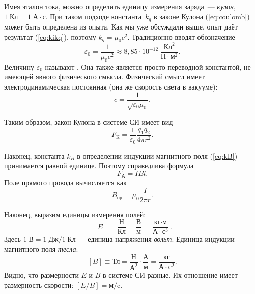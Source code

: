 Имея эталон тока, можно определить единицу измерения заряда~--- \emph{кулон},
$1\;\text{Кл}=1\;\text{А}\cdot\text{с}$. При таком подходе константа~$k_{q}$ в законе Кулона (\ref{eq:coulomb}) может быть определена
из опыта. Как мы уже обсуждали выше, опыт даёт результат (\ref{eq:kikq}),
поэтому $k_{q}=\mu_{0}c^{2}$. Традиционно вводят обозначение
\begin{equation}
\varepsilon_{0}=\frac{1}{\mu_{0}c^{2}}\approx8{,}85\cdot10^{-12}\;\frac{\text{Кл}^{2}}{\text{Н}\cdot\text{м}^{2}}.
\end{equation}
Величину $\varepsilon_{0}$ называют .
Она также является просто переводной константой, не имеющей
явного физического смысла. Физический смысл имеет электродинамическая
постоянная (она же скорость
света в вакууме):
\[
c = \frac{1}{\sqrt{\varepsilon_{0}\mu_{0}}}.
\]


Таким образом, закон Кулона в системе СИ имеет вид
\begin{equation}
F_{\text{К}}=\frac{1}{\varepsilon_{0}}\frac{q_{1}q_{2}}{4\pi r^{2}}.
\end{equation}

Наконец, константа $k_{B}$ в определении индукции магнитного поля
(\ref{eq:kB}) принимается равной единице. Поэтому справедлива формула
\begin{equation}
F_{\text{А}}=IBl.
\end{equation}
Поле прямого провода вычисляется как
\[
B_{\text{пр}}=\mu_{0}\dfrac{I}{2\pi r}.
\]

Наконец, выразим единицы измерения полей:
\[
\left[E\right]=\frac{\text{Н}}{\text{Кл}}=\frac{\text{В}}{\text{м}}=\frac{\text{кг}\cdot\text{м}}{\text{А}\cdot\text{с}^{3}}.
\]
Здесь $1\;\text{В}=1\;\text{Дж}/1\;\text{Кл}$ --- единица напряжения
\emph{вольт}. Единица индукции магнитного поля \emph{тесла}:
\[
\left[B\right]\equiv\text{Тл}=\frac{\text{Н}}{\text{А}^{2}}\cdot\frac{\text{А}}{\text{м}}=\frac{\text{кг}}{\text{А}\cdot\text{с}^{2}}.
\]
Видно, что размерности $E$ и $B$ в системе СИ разные. Их отношение имеет размерность
скорости: $\left[E/B\right]=\text{м/c}$.

